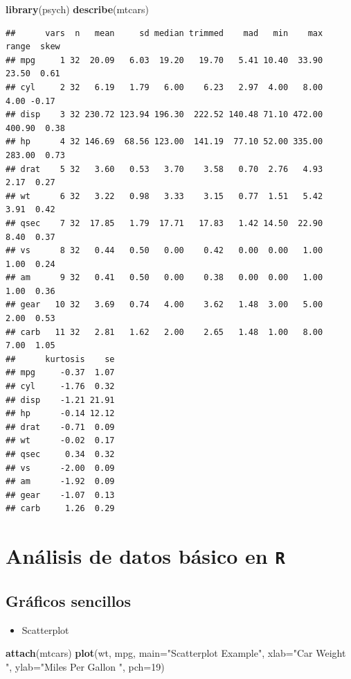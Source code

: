 \documentclass[]{book}
\newenvironment{Shaded}{\begin{snugshade}}{\end{snugshade}}
\newcommand{\KeywordTok}[1]{\textcolor[rgb]{0.13,0.29,0.53}{\textbf{#1}}}
\newcommand{\DataTypeTok}[1]{\textcolor[rgb]{0.13,0.29,0.53}{#1}}
\newcommand{\DecValTok}[1]{\textcolor[rgb]{0.00,0.00,0.81}{#1}}
\newcommand{\StringTok}[1]{\textcolor[rgb]{0.31,0.60,0.02}{#1}}
\newcommand{\NormalTok}[1]{#1}
\providecommand{\tightlist}{%
  \setlength{\itemsep}{0pt}\setlength{\parskip}{0pt}}
\begin{document}
\begin{Shaded}
\begin{Highlighting}[]
\KeywordTok{library}\NormalTok{(psych)}
\KeywordTok{describe}\NormalTok{(mtcars)}
\end{Highlighting}
\end{Shaded}

\begin{verbatim}
##      vars  n   mean     sd median trimmed    mad   min    max  range  skew
## mpg     1 32  20.09   6.03  19.20   19.70   5.41 10.40  33.90  23.50  0.61
## cyl     2 32   6.19   1.79   6.00    6.23   2.97  4.00   8.00   4.00 -0.17
## disp    3 32 230.72 123.94 196.30  222.52 140.48 71.10 472.00 400.90  0.38
## hp      4 32 146.69  68.56 123.00  141.19  77.10 52.00 335.00 283.00  0.73
## drat    5 32   3.60   0.53   3.70    3.58   0.70  2.76   4.93   2.17  0.27
## wt      6 32   3.22   0.98   3.33    3.15   0.77  1.51   5.42   3.91  0.42
## qsec    7 32  17.85   1.79  17.71   17.83   1.42 14.50  22.90   8.40  0.37
## vs      8 32   0.44   0.50   0.00    0.42   0.00  0.00   1.00   1.00  0.24
## am      9 32   0.41   0.50   0.00    0.38   0.00  0.00   1.00   1.00  0.36
## gear   10 32   3.69   0.74   4.00    3.62   1.48  3.00   5.00   2.00  0.53
## carb   11 32   2.81   1.62   2.00    2.65   1.48  1.00   8.00   7.00  1.05
##      kurtosis    se
## mpg     -0.37  1.07
## cyl     -1.76  0.32
## disp    -1.21 21.91
## hp      -0.14 12.12
## drat    -0.71  0.09
## wt      -0.02  0.17
## qsec     0.34  0.32
## vs      -2.00  0.09
## am      -1.92  0.09
## gear    -1.07  0.13
## carb     1.26  0.29
\end{verbatim}

\chapter{\texorpdfstring{Análisis de datos básico en
\texttt{R}}{Análisis de datos básico en R}}\label{analisis-de-datos-basico-en-r}

\section{Gráficos sencillos}\label{graficos-sencillos}

\begin{itemize}
\tightlist
\item
  Scatterplot
\end{itemize}

\begin{Shaded}
\begin{Highlighting}[]
\KeywordTok{attach}\NormalTok{(mtcars)}
\KeywordTok{plot}\NormalTok{(wt, mpg, }\DataTypeTok{main=}\StringTok{"Scatterplot Example"}\NormalTok{,}
   \DataTypeTok{xlab=}\StringTok{"Car Weight "}\NormalTok{, }\DataTypeTok{ylab=}\StringTok{"Miles Per Gallon "}\NormalTok{, }\DataTypeTok{pch=}\DecValTok{19}\NormalTok{) }
\end{Highlighting}
\end{Shaded}
\end{document}
